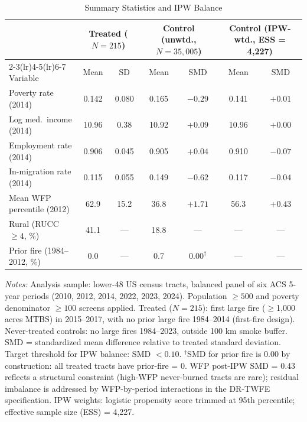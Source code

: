 \documentclass[12pt]{article}
\begin{document}
\begin{table}[ht]
\centering
\caption{Summary Statistics and IPW Balance}
\label{tab:balance}
\small
\begin{tabular}{lcccccc}
\toprule
 & \multicolumn{2}{c}{Treated ($N = 215$)}
 & \multicolumn{2}{c}{Control (unwtd., $N = 35{,}005$)}
 & \multicolumn{2}{c}{Control (IPW-wtd., ESS = 4{,}227)} \\
\cmidrule(lr){2-3}\cmidrule(lr){4-5}\cmidrule(lr){6-7}
Variable & Mean & SD & Mean & SMD & Mean & SMD \\
\midrule
Poverty rate (2014)        & 0.142 & 0.080 & 0.165 & $-0.29$ & 0.141 & $+0.01$ \\
Log med.\ income (2014)    & 10.96 & 0.38  & 10.92 & $+0.09$ & 10.96 & $+0.00$ \\
Employment rate (2014)     & 0.906 & 0.045 & 0.905 & $+0.04$ & 0.910 & $-0.07$ \\
In-migration rate (2014)   & 0.115 & 0.055 & 0.149 & $-0.62$ & 0.117 & $-0.04$ \\
Mean WFP percentile (2012) & 62.9  & 15.2  & 36.8  & $+1.71$ & 56.3  & $+0.43$ \\
Rural (RUCC $\geq 4$, \%)  & 41.1  & ---   & 18.8  & ---     & ---   & ---     \\
Prior fire (1984--2012, \%)& 0.0   & ---   & 0.7   & $0.00^\dagger$ & --- & --- \\
\bottomrule
\end{tabular}
\medskip

\noindent\footnotesize
\textit{Notes:} Analysis sample: lower-48 US census tracts,
balanced panel of six ACS 5-year periods (2010, 2012, 2014, 2022, 2023, 2024).
Population $\geq 500$ and poverty denominator $\geq 100$ screens applied.
Treated ($N = 215$): first large fire ($\geq$1,000 acres MTBS) in 2015--2017,
with no prior large fire 1984--2014 (first-fire design).
Never-treated controls: no large fires 1984--2023, outside 100 km smoke buffer.
SMD = standardized mean difference relative to treated standard deviation.
Target threshold for IPW balance: SMD $< 0.10$.
$^\dagger$SMD for prior fire is 0.00 by construction: all treated tracts
have prior-fire = 0.
WFP post-IPW SMD = 0.43 reflects a structural constraint
(high-WFP never-burned tracts are rare); residual imbalance
is addressed by WFP-by-period interactions in the DR-TWFE specification.
IPW weights: logistic propensity score trimmed at 95th percentile;
effective sample size (ESS) = 4,227.
\end{table}
\end{document}
